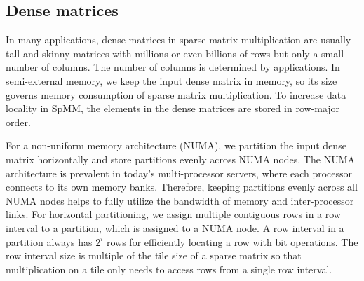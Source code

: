 
\subsection{Dense matrices}
In many applications, dense matrices in sparse matrix multiplication are usually
tall-and-skinny matrices with millions or even billions of rows but only a small
number of columns. The number of columns is determined by applications.
In semi-external memory,
we keep the input dense matrix in memory, so its size governs memory consumption
of sparse matrix multiplication. To increase data locality in SpMM, the elements
in the dense matrices are stored in row-major order.

For a non-uniform memory architecture (NUMA), we partition the input dense matrix
horizontally and store partitions evenly across NUMA nodes. The NUMA architecture
is prevalent in today's multi-processor servers, where each processor connects
to its own memory banks. Therefore, keeping partitions evenly across all NUMA
nodes helps to fully utilize the bandwidth of memory and inter-processor links.
For horizontal partitioning, we assign multiple contiguous rows in a row
interval to a partition, which is assigned to a NUMA node. A row interval
in a partition always has $2^i$ rows for efficiently locating a row
with bit operations. The row interval size is multiple of the tile size of
a sparse matrix so that multiplication on a tile only needs to access rows
from a single row interval.


